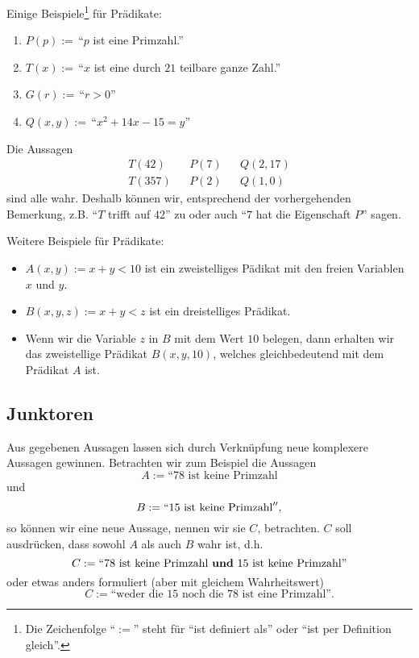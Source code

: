 \begin{bsp}
  Einige Beispiele\footnote{Die Zeichenfolge ``$:=$'' steht für ``ist definiert als'' oder ``ist per Definition gleich''.} für Prädikate:
  \begin{enumerate}
  \item $P(p):= $\,``$p$ ist eine Primzahl.''
  \item $T(x):= $\,``$x$ ist eine durch $21$ teilbare ganze Zahl.''
  \item $G(r):= $\,``$r>0$''
  \item $Q(x,y):= $\,``$x^2+14x-15=y$''
  \end{enumerate}
  Die Aussagen
  \begin{align*}
  &T(42)& 	    &P(7)&		&Q(2,17)&\\
  &T(357)&  &P(2)& 	&Q(1,0)&
  \end{align*}
  sind alle wahr. Deshalb können wir, entsprechend der vorhergehenden Bemerkung, z.B. ``$T$ trifft auf $42$'' zu oder auch ``$7$ hat die Eigenschaft $P$'' sagen.
\end{bsp}

\begin{bsp}
  Weitere Beispiele für Prädikate:
  \begin{itemize}
    \item $A(x,y) := x + y < 10$ ist ein zweistelliges Pädikat mit den freien Variablen $x$ und $y$.
    \item $B(x,y,z) := x + y < z$ ist ein dreistelliges Prädikat.
    \item Wenn wir die Variable $z$ in $B$ mit dem Wert $10$ belegen, dann erhalten wir das zweistellige Prädikat $B(x,y,10)$, welches gleichbedeutend mit dem Prädikat $A$ ist.
  \end{itemize}
\end{bsp}

\subsection*{Junktoren}
Aus gegebenen Aussagen lassen sich durch Verknüpfung neue komplexere Aussagen
gewinnen. Betrachten wir zum Beispiel die Aussagen
\[
A:=\text{``}78\text{ ist keine Primzahl}
\]
und
\[
 B:=``15\text{ ist keine Primzahl}'',
\]
so können wir eine neue Aussage, nennen wir sie $C$, betrachten. $C$ soll ausdrücken, dass sowohl $A$ als auch $B$ wahr ist, d.h.
\[
 C:=\text{``}78\text{ ist keine Primzahl \textbf{und} }15\text{ ist keine Primzahl}\text{''}
\]
oder etwas anders formuliert (aber mit gleichem Wahrheitswert)
\[
 C:=\text{``weder die }15\text{ noch die }78\text{ ist eine Primzahl}\text{''}.
\]


